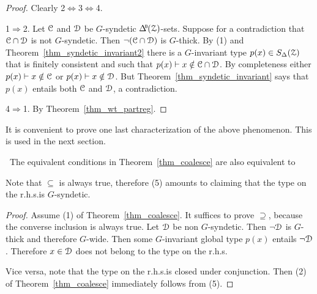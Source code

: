 \begin{proof}
  Clearly 2$\Leftrightarrow$3$\Leftrightarrow$4.

  1$\Rightarrow$2.
  Let $\EuScript C$ and $\EuScript D$ be $G$-syndetic $\BDelta({\Z})$-sets.
  Suppose for a contradiction that $\EuScript C\cap\EuScript D$ is not $G$-syndetic.
  Then $\neg(\EuScript C\cap\EuScript D)$ is $G$-thick.
  By (1) and Theorem~\ref{thm_syndetic_invariant2} there is a $G$-invariant type $p(x)\in S_\Delta(\EuScript Z)$ that is finitely consistent and such that $p(x)\vdash x\notin\EuScript C\cap\EuScript D$.
  By completeness either $p(x)\vdash x\notin\EuScript C$ or $p(x)\vdash x\notin\EuScript D$.
  But Theorem~\ref{thm_syndetic_invariant} says that $p(x)$ entails both $\EuScript C$ and $\EuScript D$, a contradiction.


  4$\Rightarrow$1. By Theorem~\ref{thm_wt_partreg}.
\end{proof}

It is convenient to prove one last characterization of the above phenomenon.
This is used in the next section. 

\begin{proposition}\label{prop_coalese}\ 
  The equivalent conditions in Theorem~\ref{thm_coalesce} are also equivalent to\smallskip

\end{proposition}

Note that $\subseteq$ is always true, therefore (5) amounts to claiming that the type on the r.h.s.\@ is $G$-syndetic.
\begin{proof} 
  Assume (1) of Theorem~\ref{thm_coalesce}.
  It suffices to prove $\supseteq$, because the converse inclusion is always true. 
  Let $\EuScript D$ be non $G$-syndetic.
  Then $\neg\EuScript D$ is $G$-thick and therefore $G$-wide.
  Then some $G$-invariant global type $p(x)$ entails $\neg\EuScript D$.
  Therefore $x\in\EuScript D$ does not belong to the type on the r.h.s.
  
  Vice versa, note that the type on the r.h.s.\@ is closed under conjunction.
  Then (2) of Theorem~\ref{thm_coalesce} immediately follows from (5).
\end{proof}


